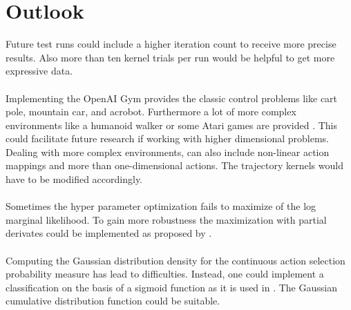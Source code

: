 \chapter{Outlook}
\label{chap:7}

 Future test runs could include a higher iteration count to receive more precise results. Also more than ten kernel trials per run would be helpful to get more expressive data.\\
\\
Implementing the OpenAI Gym provides the classic control problems like cart pole, mountain car, and acrobot. Furthermore a lot of more complex environments like a humanoid walker or some Atari games are provided \cite{DBLP:journals/corr/BrockmanCPSSTZ16}. This could facilitate future research if working with higher dimensional problems.\\
Dealing with more complex environments, can also include non-linear action mappings and more than one-dimensional actions. The trajectory kernels would have to be modified accordingly.\\
\\
Sometimes the hyper parameter optimization fails to maximize of the log marginal likelihood. To gain more robustness the maximization with partial derivates could be implemented as proposed by \cite{rasmussen2006gaussian, lizotte2008practical}.\\
\\
Computing the Gaussian distribution density for the continuous action selection probability measure has lead to difficulties. Instead, one could implement a classification on the basis of a sigmoid function as it is used in \cite{rasmussen2006gaussian}. The Gaussian cumulative distribution function could be suitable.\\
\\
